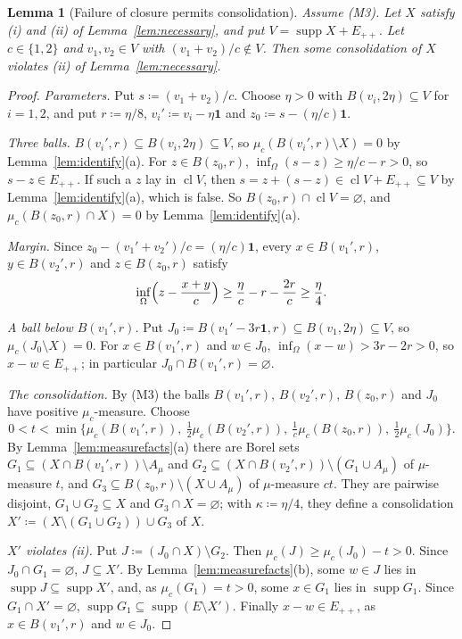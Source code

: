 \documentclass[11pt]{article}
\newtheorem{lemma}[theorem]{Lemma}
\theoremstyle{definition}
\newcommand{\one}{\mathbf 1}
\newcommand{\Epp}{E_{++}}
\DeclareMathOperator{\supp}{supp}
\DeclareMathOperator{\cl}{cl}
\begin{document}
\begin{lemma}[Failure of closure permits consolidation]\label{lem:gap}
Assume (M3). Let $X$ satisfy (i) and (ii) of Lemma~\ref{lem:necessary}, and put
$V=\supp X+\Epp$. Let $c\in\{1,2\}$ and $v_1,v_2\in V$ with $(v_1+v_2)/c\notin V$. Then some consolidation of $X$ violates (ii) of Lemma~\ref{lem:necessary}.
\end{lemma}
\begin{proof}
\emph{Parameters.} Put $s\coloneqq(v_1+v_2)/c$. Choose $\eta>0$ with $B(v_i,2\eta)\subseteq V$ for $i=1,2$, and put $r\coloneqq\eta/8$, $v_i'\coloneqq v_i-\eta\one$ and $z_0\coloneqq s-(\eta/c)\one$.

\emph{Three balls.} $B(v_i',r)\subseteq B(v_i,2\eta)\subseteq V$, so $\mu_c(B(v_i',r)\setminus X)=0$ by Lemma~\ref{lem:identify}(a). For $z\in B(z_0,r)$, $\inf_\Omega(s-z)\ge\eta/c-r>0$, so $s-z\in\Epp$. If such a $z$ lay in $\cl V$, then $s=z+(s-z)\in\cl V+\Epp\subseteq V$ by Lemma~\ref{lem:identify}(a), which is false. So $B(z_0,r)\cap\cl V=\varnothing$, and $\mu_c(B(z_0,r)\cap X)=0$ by Lemma~\ref{lem:identify}(a).

\emph{Margin.} Since $z_0-(v_1'+v_2')/c=(\eta/c)\one$, every $x\in B(v_1',r)$, $y\in B(v_2',r)$ and $z\in B(z_0,r)$ satisfy
\[
\inf_\Omega\Bigl(z-\frac{x+y}c\Bigr)\ge\frac\eta c-r-\frac{2r}c\ge\frac\eta4 .
\]

\emph{A ball below $B(v_1',r)$.} Put $J_0\coloneqq B(v_1'-3r\one,r)\subseteq B(v_1,2\eta)\subseteq V$, so $\mu_c(J_0\setminus X)=0$. For $x\in B(v_1',r)$ and $w\in J_0$, $\inf_\Omega(x-w)>3r-2r>0$, so $x-w\in\Epp$; in particular $J_0\cap B(v_1',r)=\varnothing$.

\emph{The consolidation.} By (M3) the balls $B(v_1',r)$, $B(v_2',r)$, $B(z_0,r)$ and $J_0$ have positive $\mu_c$-measure. Choose
\[
0<t<\min\bigl\{\mu_c(B(v_1',r)),\ \tfrac12\mu_c(B(v_2',r)),\ \tfrac1c\mu_c(B(z_0,r)),\ \tfrac12\mu_c(J_0)\bigr\}.
\]
By Lemma~\ref{lem:measurefacts}(a) there are Borel sets $G_1\subseteq(X\cap B(v_1',r))\setminus A_\mu$ and $G_2\subseteq(X\cap B(v_2',r))\setminus(G_1\cup A_\mu)$ of $\mu$-measure $t$, and $G_3\subseteq B(z_0,r)\setminus(X\cup A_\mu)$ of $\mu$-measure $ct$. They are pairwise disjoint, $G_1\cup G_2\subseteq X$ and $G_3\cap X=\varnothing$; with $\kappa\coloneqq\eta/4$, they define a consolidation $X'\coloneqq(X\setminus(G_1\cup G_2))\cup G_3$ of $X$.

\emph{$X'$ violates (ii).} Put $J\coloneqq(J_0\cap X)\setminus G_2$. Then $\mu_c(J)\ge\mu_c(J_0)-t>0$. Since $J_0\cap G_1=\varnothing$, $J\subseteq X'$. By Lemma~\ref{lem:measurefacts}(b), some $w\in J$ lies in $\supp J\subseteq\supp X'$, and, as $\mu_c(G_1)=t>0$, some $x\in G_1$ lies in $\supp G_1$. Since $G_1\cap X'=\varnothing$, $\supp G_1\subseteq\supp(E\setminus X')$. Finally $x-w\in\Epp$, as $x\in B(v_1',r)$ and $w\in J_0$.
\end{proof}
\end{document}
